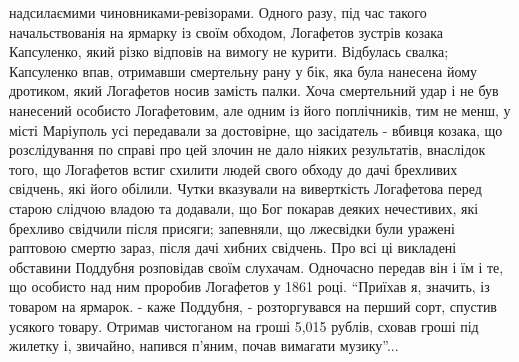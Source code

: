 \documentclass[a4paper,20pt]{report}
\begin{document}
надсилаємими чиновниками-ревізорами.
Одного разу, під час такого начальствованія на ярмарку із своїм обходом, Логафетов
зустрів козака Капсуленко, який різко відповів на вимогу не курити. Відбулась свалка; 
Капсуленко впав, отримавши смертельну рану у бік, яка була нанесена йому дротиком, який
Логафетов носив замість палки. Хоча смертельний удар і не був нанесений особисто
Логафетовим, але одним із його поплічників, тим не менш, у місті Маріуполь усі передавали
за достовірне, що засідатель - вбивця козака, що розслідування по справі про цей злочин
не дало ніяких результатів, внаслідок того, що Логафетов встиг схилити людей свого обходу до дачі
брехливих свідчень, які його обілили. Чутки вказували на виверткість Логафетова перед старою слідчою
владою та додавали, що Бог покарав деяких нечестивих, які брехливо свідчили після присяги; запевняли, що
лжесвідки були уражені раптовою смертю зараз, після дачі хибних свідчень. 
Про всі ці викладені обставини Поддубня розповідав своїм слухачам. Одночасно
передав він і їм і те, що особисто над ним проробив Логафетов у 1861 році. ``Приїхав
я, значить, із товаром на ярмарок. - каже Поддубня, - розторгувався на перший сорт, спустив усякого
товару. Отримав чистоганом на гроші 5,015 рублів, сховав гроші під жилетку і, звичайно, напився п'яним, почав 
вимагати музику''...
\end{document}
